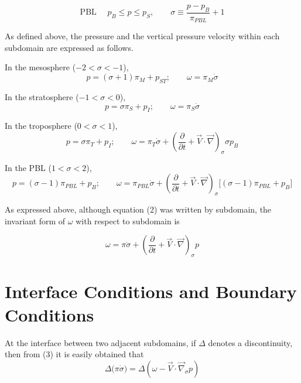 \documentclass[12pt,openany]{book}
\begin{document}
\begin{equation}
\text{PBL } \quad
p_B \le p \le p_S,
\qquad
\sigma \equiv \frac{p - p_B}{\pi_{PBL}} + 1
\tag{3.1d}
\label{3.1d}
\end{equation}

As defined above, the pressure and the vertical pressure velocity
within each subdomain are expressed as follows.

\bigskip

In the mesosphere ($-2 < \sigma < -1$),
\begin{equation}
p = (\sigma + 1)\pi_M + p_{ST};
\qquad
\omega = \pi_M \dot{\sigma}
\tag{3.2a}
\label{3.2a}
\end{equation}

In the stratosphere ($-1 < \sigma < 0$),
\begin{equation}
p = \sigma \pi_S + p_I;
\qquad
\omega = \pi_S \dot{\sigma}
\tag{3.2b}
\label{3.2b}
\end{equation}

In the troposphere ($0 < \sigma < 1$),
\begin{equation}
p = \sigma \pi_T + p_I;
\qquad
\omega =
\pi_T \dot{\sigma}
+
\left(
\frac{\partial}{\partial t}
+
\vec{V} \cdot \vec{\nabla}
\right)_{\sigma}
\sigma p_B
\tag{3.2c}
\label{3.2c}
\end{equation}

In the PBL ($1 < \sigma < 2$),
\begin{equation}
p = (\sigma - 1)\pi_{PBL} + p_B;
\qquad
\omega =
\pi_{PBL} \dot{\sigma}
+
\left(
\frac{\partial}{\partial t}
+
\vec{V} \cdot \vec{\nabla}
\right)_{\sigma}
\bigl[(\sigma - 1)\pi_{PBL} + p_B\bigr]
\tag{3.2d}
\label{3.2d}
\end{equation}

As expressed above, although equation (2) was written by subdomain,
the invariant form of $\omega$ with respect to subdomain is

\begin{equation}
\omega =
\pi \dot{\sigma}
+
\left(
\frac{\partial}{\partial t}
+
\vec{V} \cdot \vec{\nabla}
\right)_{\sigma}
p
\tag{3.3}
\label{3.3}
\end{equation}

\section{Interface Conditions and Boundary Conditions}

At the interface between two adjacent subdomains, if $\Delta$ denotes a
discontinuity, then from (3) it is easily obtained that
\begin{equation}
\Delta \bigl( \pi \dot{\sigma} \bigr)
=
\Delta \left(
\omega - \vec{V} \cdot \vec{\nabla}_{\sigma} p
\right)
\tag{3.4}
\label{3.4}
\end{equation}
\end{document}

